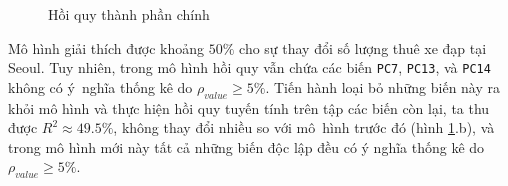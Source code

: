 \begin{figure}[H]
	\centering
	 \hfill
	\caption{Hồi quy thành phần chính}
	\label{A2_modPCA}
\end{figure}

Mô hình giải thích được khoảng $50\%$ cho sự thay đổi số lượng thuê xe đạp tại Seoul. Tuy nhiên, trong mô hình hồi quy vẫn chứa các biến \texttt{PC7}, \texttt{PC13}, và \texttt{PC14} không có ý~nghĩa thống kê do $\rho_{value} \ge 5\%$. Tiến hành loại bỏ những biến này ra khỏi mô hình và thực hiện hồi quy tuyến tính trên tập các biến còn lại, ta thu được $R^{2} \approx 49.5\% $, không thay đổi nhiều so với mô~hình trước đó (hình \ref{A2_modPCA}.b), và trong mô hình mới này tất cả những biến độc lập đều có ý nghĩa thống kê do $\rho_{value} \ge 5\%$.

